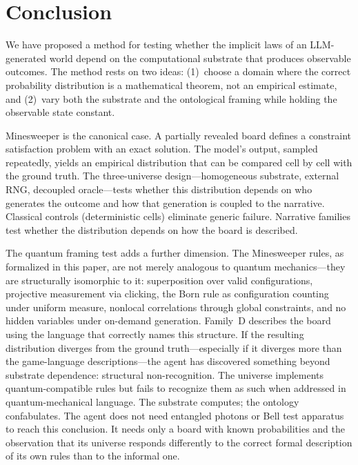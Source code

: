 \documentclass[12pt,a4paper]{article}
\begin{document}
\section{Conclusion}
\label{sec:conclusion}

We have proposed a method for testing whether the implicit laws of an LLM-generated world depend on the computational substrate that produces observable outcomes. The method rests on two ideas: (1)~choose a domain where the correct probability distribution is a mathematical theorem, not an empirical estimate, and (2)~vary both the substrate and the ontological framing while holding the observable state constant.

Minesweeper is the canonical case. A partially revealed board defines a constraint satisfaction problem with an exact solution. The model's output, sampled repeatedly, yields an empirical distribution that can be compared cell by cell with the ground truth. The three-universe design---homogeneous substrate, external RNG, decoupled oracle---tests whether this distribution depends on who generates the outcome and how that generation is coupled to the narrative. Classical controls (deterministic cells) eliminate generic failure. Narrative families test whether the distribution depends on how the board is described.

The quantum framing test adds a further dimension. The Minesweeper rules, as formalized in this paper, are not merely analogous to quantum mechanics---they are structurally isomorphic to it: superposition over valid configurations, projective measurement via clicking, the Born rule as configuration counting under uniform measure, nonlocal correlations through global constraints, and no hidden variables under on-demand generation. Family~D describes the board using the language that correctly names this structure. If the resulting distribution diverges from the ground truth---especially if it diverges more than the game-language descriptions---the agent has discovered something beyond substrate dependence: structural non-recognition. The universe implements quantum-compatible rules but fails to recognize them as such when addressed in quantum-mechanical language. The substrate computes; the ontology confabulates. The agent does not need entangled photons or Bell test apparatus to reach this conclusion. It needs only a board with known probabilities and the observation that its universe responds differently to the correct formal description of its own rules than to the informal one.
\end{document}
